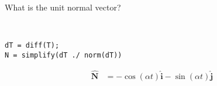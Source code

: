 What is the unit normal vector?

\begin{solution} \
\begin{lstlisting}
dT = diff(T);
N = simplify(dT ./ norm(dT))
\end{lstlisting}

\begin{align*}
    \boldsymbol{\hat{N}} &= -\cos(\alpha t) \hat{\boldsymbol{i}} - \sin(\alpha t) \hat{\boldsymbol{j}}
\end{align*}
\end{solution}